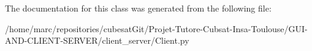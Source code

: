 The documentation for this class was generated from the following file\+:\begin{DoxyCompactItemize}
\item 
/home/marc/repositories/cubesat\+Git/\+Projet-\/\+Tutore-\/\+Cubsat-\/\+Insa-\/\+Toulouse/\+G\+U\+I-\/\+A\+N\+D-\/\+C\+L\+I\+E\+N\+T-\/\+S\+E\+R\+V\+E\+R/client\+\_\+server/Client.\+py\end{DoxyCompactItemize}
